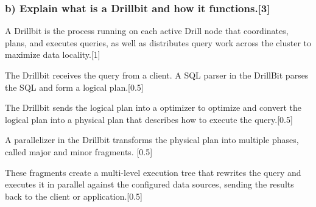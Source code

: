 \documentclass[11pt,a4paper]{article}
\begin{document}
\subsubsection*{b) Explain what is a Drillbit and how it functions.[3]}
A Drillbit is the process running on each active Drill node that coordinates, plans, and executes queries, as well as distributes query work across the cluster to maximize data locality.[1]

The Drillbit receives the query from a client. A SQL parser in the DrillBit parses the SQL and form a logical plan.[0.5]

The Drillbit sends the logical plan into a optimizer to optimize and convert the logical plan into a physical plan that describes how to execute the query.[0.5]

A parallelizer in the Drillbit transforms the physical plan into multiple phases, called major and minor fragments. [0.5]

These fragments create a multi-level execution tree that rewrites the query and executes it in parallel against the configured data sources, sending the results back to the client or application.[0.5]
\end{document}
